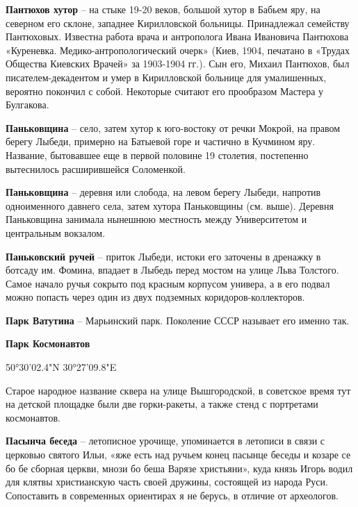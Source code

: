 \medskip

\textbf{Пантюхов хутор} – на стыке 19-20 веков, большой хутор в Бабьем яру, на северном его склоне, западнее Кирилловской больницы. Принадлежал семейству Пантюховых. Известна работа врача и антрополога Ивана Ивановича Пантюхова «Куреневка. Медико-антропологи\-ческий очерк» (Киев, 1904, печатано в «Трудах Общества Киевских Врачей» за 1903-1904 гг.). Сын его, Михаил Пантюхов, был писателем-декадентом и умер в Кирилловской больнице для умалишенных, вероятно покончил с собой. Некоторые считают его прообразом Мастера у Булгакова.\\

\medskip

\textbf{Паньковщина} – село, затем хутор к юго-востоку от речки Мокрой, на правом берегу Лыбеди, примерно на Батыевой горе и частично в Кучмином яру. Название, бытовавшее еще в первой половине 19 столетия, постепенно вытеснилось расширившейся Соломенкой.\\

\medskip

\textbf{Паньковщина} – деревня или слобода, на левом берегу Лыбеди, напротив одноименного давнего села, затем хутора Паньковщины (см. выше). Деревня Паньковщина занимала нынешнюю местность между Университетом и центральным вокзалом.\\

\medskip

\textbf{Паньковский ручей} – приток Лыбеди, истоки его заточены в дренажку в ботсаду им. Фомина, впадает в Лыбедь перед мостом на улице Льва Толстого. Самое начало ручья сокрыто под красным корпусом универа, а в его подвал можно попасть через один из двух подземных коридоров-коллекторов.\\

\medskip

\textbf{Парк Ватутина} – Марьинский парк. Поколение СССР называет его именно так.\\

\newpage

\textbf{Парк Космонавтов}

50°30'02.4"N 30°27'09.8"E

Старое народное название сквера на улице Вышгородской, в советское время тут на детской площадке были две горки-ракеты, а также стенд с портретами космонавтов.\\

\medskip

\textbf{Пасынча беседа} – летописное урочище, уп\-оминается в летописи в связи с церковью святого Ильи, «яже есть над ручьем конец пасынце беседы и козаре се бо бе сборная церкви, мнози бо беша Варязе христьяни», куда князь Игорь водил для клятвы христианскую часть своей дружины, состоящей из народа Руси. Сопоставить в современных ориентирах я не берусь, в отличие от археологов.\\

